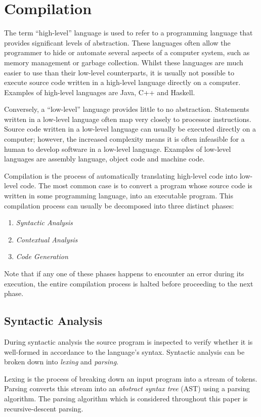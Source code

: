 \documentclass{l4proj}
\begin{document}
\section{Compilation}
The term ``high-level'' language is used to refer to a programming language that provides significant levels of abstraction. These languages often allow the programmer to hide or automate several aspects of a computer system, such as memory management or garbage collection. Whilst these languages are much easier to use than their low-level counterparts, it is usually not possible to execute source code written in a high-level language directly on a computer. Examples of high-level languages are Java, C++ and Haskell.

Conversely, a ``low-level'' language provides little to no abstraction. Statements written in a low-level language often map very closely to processor instructions. Source code written in a low-level language can usually be executed directly on a computer; however, the increased complexity means it is often infeasible for a human to develop software in a low-level language. Examples of low-level languages are assembly language, object code and machine code.

Compilation is the process of automatically translating high-level code into low-level code. The most common case is to convert a program whose source code is written in some programming language, into an executable program. This compilation process can usually be decomposed into three distinct phases: 
\begin{enumerate}[label=\alph*)]
\item \textit {Syntactic Analysis}
\item \textit {Contextual Analysis}
\item \textit {Code Generation}
\end{enumerate}
Note that if any one of these phases happens to encounter an error during its execution, the entire compilation process is halted before proceeding to the next phase.

\subsection{Syntactic Analysis}
During syntactic analysis the source program is inspected to verify whether it is well-formed in accordance to the language's syntax. Syntactic analysis can be broken down into \textit{lexing} and \textit{parsing}.

Lexing is the process of breaking down an input program into a stream of tokens. Parsing converts this stream into an \textit{abstract syntax tree} (AST) using a parsing algorithm. The parsing algorithm which is considered throughout this paper is recursive-descent parsing.
\end{document}
